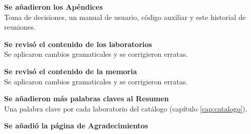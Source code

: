        \textbf{Se añadieron los Apéndices} \\
        Toma de decisiones, un manual de usuario, código auxiliar y este historial de reuniones.

        \textbf{Se revisó el contenido de los laboratorios} \\
        Se aplicaron cambios gramaticales y se corrigieron erratas.
    
        \textbf{Se revisó el contenido de la memoria} \\
        Se aplicaron cambios gramaticales y se corrigieron erratas.

        \textbf{Se añadieron más palabras claves al Resumen} \\
        Una palabra clave por cada laboratorio del catálogo (capítulo \ref{cap:catalogo}).

        \textbf{Se añadió la página de Agradecimientos} \\
        